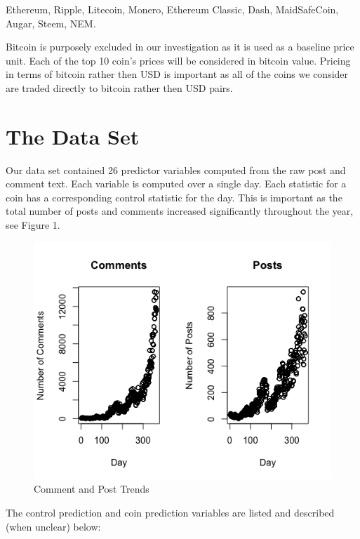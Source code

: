 \documentclass[12pt]{article}
\begin{document}
\indent Ethereum, Ripple, Litecoin, Monero, Ethereum Classic, Dash, MaidSafeCoin, Augar, Steem, NEM.

\indent Bitcoin is purposely excluded in our investigation as it is used as a baseline price unit. Each of the top 10 coin's prices will be considered in bitcoin value. Pricing in terms of bitcoin rather then USD is important as all of the coins we consider are traded directly to bitcoin rather then USD pairs.




\section{The Data Set}\label{dataset}

\indent \indent Our data set contained 26 predictor variables computed from the raw post and comment text. Each variable is computed over a single day. Each statistic for a coin has a corresponding control statistic for the day. This is important as the total number of posts and comments increased significantly throughout the year, see Figure 1.

\begin{figure}

\centering
  \includegraphics[width=\linewidth]{images/TotalCommentsPosts.png}
 \caption{Comment and Post Trends}
\label{label}

\end{figure}

The control prediction and coin prediction variables are listed and described (when unclear) below:
\end{document}
